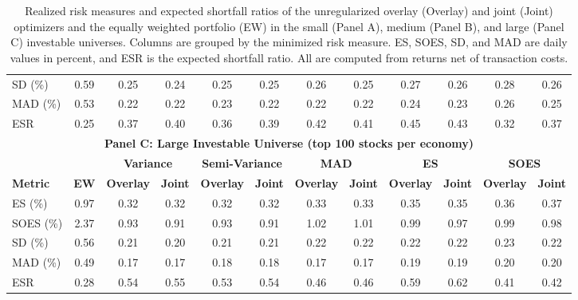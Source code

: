 \begin{table}[!htbp]
{\begin{tabular}{l*{11}{c}}
    SD (\%) & 0.59 & 0.25 & 0.24 & 0.25 & 0.25 & 0.26 & 0.25 & 0.27 & 0.26 & 0.28 & 0.26 \\
    MAD (\%) & 0.53 & 0.22 & 0.22 & 0.23 & 0.22 & 0.22 & 0.22 & 0.24 & 0.23 & 0.26 & 0.25 \\
    ESR & 0.25 & 0.37 & 0.40 & 0.36 & 0.39 & 0.42 & 0.41 & 0.45 & 0.43 & 0.32 & 0.37 \\
    \midrule
    \multicolumn{12}{c}{\textbf{Panel C: Large Investable Universe (top 100 stocks per economy)}} \\
    \midrule
    & & \multicolumn{2}{c}{\textbf{Variance}} & \multicolumn{2}{c}{\textbf{Semi-Variance}} & \multicolumn{2}{c}{\textbf{MAD}} & \multicolumn{2}{c}{\textbf{ES}} & \multicolumn{2}{c}{\textbf{SOES}} \\
    \cmidrule(lr){3-4} \cmidrule(lr){5-6} \cmidrule(lr){7-8} \cmidrule(lr){9-10} \cmidrule(lr){11-12}
    \textbf{Metric} & \textbf{EW} & \textbf{Overlay} & \textbf{Joint} & \textbf{Overlay} & \textbf{Joint} & \textbf{Overlay} & \textbf{Joint} & \textbf{Overlay} & \textbf{Joint} & \textbf{Overlay} & \textbf{Joint} \\
    \midrule
    ES (\%) & 0.97 & 0.32 & 0.32 & 0.32 & 0.32 & 0.33 & 0.33 & 0.35 & 0.35 & 0.36 & 0.37 \\
    SOES (\%) & 2.37 & 0.93 & 0.91 & 0.93 & 0.91 & 1.02 & 1.01 & 0.99 & 0.97 & 0.99 & 0.98 \\
    SD (\%) & 0.56 & 0.21 & 0.20 & 0.21 & 0.21 & 0.22 & 0.22 & 0.22 & 0.22 & 0.23 & 0.22 \\
    MAD (\%) & 0.49 & 0.17 & 0.17 & 0.18 & 0.18 & 0.17 & 0.17 & 0.19 & 0.19 & 0.20 & 0.20 \\
    ESR & 0.28 & 0.54 & 0.55 & 0.53 & 0.54 & 0.46 & 0.46 & 0.59 & 0.62 & 0.41 & 0.42 \\
    \bottomrule
  \end{tabular}
  }
  \caption{Realized risk measures and expected shortfall ratios of the unregularized overlay (Overlay) and joint (Joint) optimizers and the equally weighted portfolio (EW) in the small (Panel A), medium (Panel B), and large (Panel C) investable universes. Columns are grouped by the minimized risk measure. ES, SOES, SD, and MAD are daily values in percent, and ESR is the expected shortfall ratio. All are computed from returns net of transaction costs.}
  \label{tab:additional-baseline}
\end{table}

